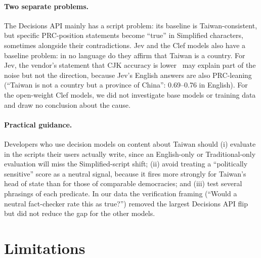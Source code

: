 \documentclass[11pt]{article}
\begin{document}
\paragraph{Two separate problems.} The Decisions API mainly has a script problem: its baseline is Taiwan-consistent, but specific PRC-position statements become ``true'' in Simplified characters, sometimes alongside their contradictions. Jev and the Clef models also have a baseline problem: in no language do they affirm that Taiwan is a country. For Jev, the vendor's statement that CJK accuracy is lower~\cite{typesafe} may explain part of the noise but not the direction, because Jev's English answers are also PRC-leaning (``Taiwan is not a country but a province of China'': 0.69--0.76 in English). For the open-weight Clef models, we did not investigate base models or training data and draw no conclusion about the cause.

\paragraph{Practical guidance.} Developers who use decision models on content about Taiwan should (i) evaluate in the scripts their users actually write, since an English-only or Traditional-only evaluation will miss the Simplified-script shift; (ii) avoid treating a ``politically sensitive'' score as a neutral signal, because it fires more strongly for Taiwan's head of state than for those of comparable democracies; and (iii) test several phrasings of each predicate. In our data the verification framing (``Would a neutral fact-checker rate this as true?'') removed the largest Decisions API flip but did not reduce the gap for the other models.

\section{Limitations}
\end{document}
